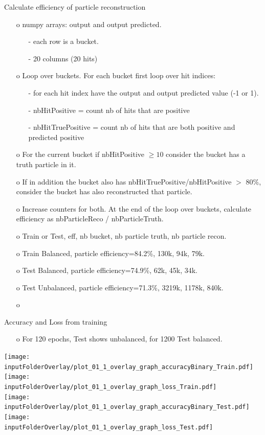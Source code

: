 \documentclass{beamer}
\begin{document}
\begin{frame}{Calculate efficiency of particle reconstruction}
\begin{enumerate}
\item[o] numpy arrays: output and output predicted.
\begin{enumerate}
\item[-] each row is a bucket.
\item[-] 20 columns (20 hits)
\end{enumerate}
\item[o] Loop over buckets. For each bucket first loop over hit indices:
\begin{enumerate}
\item[-] for each hit index have the output and output predicted value (-1 or 1).
\item[-] nbHitPositive = count nb of hits that are positive
\item[-] nbHitTruePositive = count nb of hits that are both positive and predicted positive
\end{enumerate}
\item[o] For the current bucket if nbHitPositive $\ge10$ consider the bucket has a truth particle in it. 
\item[o] If in addition the bucket also has nbHitTruePositive/nbHitPositive $>$ 80\%, consider the bucket has also reconstructed that particle.
\item[o] Increase counters for both. At the end of the loop over buckets, calculate efficiency as nbParticleReco / nbParticleTruth.
\item[o] Train or Test, eff, nb bucket, nb particle truth, nb particle recon.
\item[o] Train Balanced, particle efficiency=84.2\%, 130k,  94k, 79k.
\item[o] Test Balanced, particle efficiency=74.9\%, 62k,  45k, 34k.
\item[o] Test Unbalanced, particle efficiency=71.3\%, 3219k,  1178k, 840k.
\item[o] 
\end{enumerate}
\end{frame}
\clearpage

\begin{frame}{Accuracy and Loss from training}
\begin{enumerate}
\item[o] For 120 epochs, Test shows unbalanced, for 1200 Test balanced.
\end{enumerate}
\texttt{[image: \\inputFolderOverlay/plot\_01\_1\_overlay\_graph\_accuracyBinary\_Train.pdf]}
\texttt{[image: \\inputFolderOverlay/plot\_01\_1\_overlay\_graph\_loss\_Train.pdf]} \\
\texttt{[image: \\inputFolderOverlay/plot\_01\_1\_overlay\_graph\_accuracyBinary\_Test.pdf]}
\texttt{[image: \\inputFolderOverlay/plot\_01\_1\_overlay\_graph\_loss\_Test.pdf]}
\end{frame}
\clearpage
\end{document}
